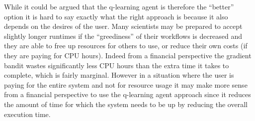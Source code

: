 While it could be argued that the q-learning agent is therefore the “better” option it is hard to say exactly what the right approach is because it also depends on the desires of the user. Many scientists may be prepared to accept slightly longer runtimes if the “greediness” of their workflows is decreased and they are able to free up resources for others to use, or reduce their own costs (if they are paying for CPU hours). Indeed from a financial perspective the gradient bandit wastes significantly less CPU hours than the extra time it takes to complete, which is fairly marginal. However in a situation where the user is paying for the entire system and not for resource usage it may make more sense from a financial perspective to use the q-learning agent approach since it reduces the amount of time for which the system needs to be up by reducing the overall execution time.
